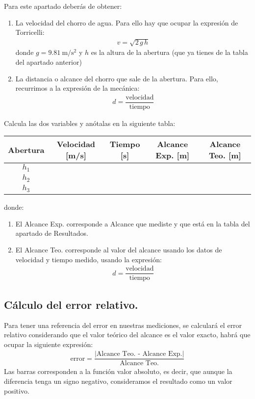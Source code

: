 \documentclass[14pt]{extarticle}
\begin{document}
Para este apartado deberás de obtener:
\begin{enumerate}[label=\roman*)]
\item La velocidad del chorro de agua. Para ello hay que ocupar la expresión de Torricelli:
\begin{align*}
v = \sqrt{2 \, g \, h}
\end{align*}
donde $ g = \SI{9.81}{\meter\per\square\second}$ y $h$ es la altura de la abertura (que ya tienes de la tabla del apartado anterior)
\item La distancia o alcance del chorro que sale de la abertura. Para ello, recurrimos a la expresión de la mecánica:
\begin{align*}
d = \dfrac{\text{velocidad}}{\text{tiempo}}
\end{align*}
\end{enumerate}
Calcula las dos variables y anótalas en la siguiente tabla:
\begin{table}[H]
\centering
\begin{tabular}{| c | c | c | c | c |} \hline
Abertura & Velocidad [m/s] & Tiempo [s] & Alcance Exp. [m] & Alcance Teo. [m] \\ \hline
$h_{1}$ & & & & \\ \hline
$h_{2}$ & & & & \\ \hline
$h_{3}$ & & & & \\ \hline
\end{tabular}
\end{table}
donde:
\begin{enumerate}
\item El Alcance Exp. corresponde a Alcance que mediste y que está en la tabla del apartado de Resultados.
\item El Alcance Teo. corresponde al valor del alcance usando los datos de velocidad y tiempo medido, usando la expresión:
\begin{align*}
d = \dfrac{\text{velocidad}}{\text{tiempo}}
\end{align*}
\end{enumerate}

\subsection{Cálculo del error relativo.}

Para tener una referencia del error en nuestras mediciones, se calculará el error relativo considerando que el valor teórico del alcance es el valor exacto, habrá que ocupar la siguiente expresión:
\begin{align*}
\text{error} = \dfrac{\vert \text{Alcance Teo. - Alcance Exp.} \vert}{\text{Alcance Teo.}}
\end{align*}
Las barras corresponden a la función valor absoluto, es decir, que aunque la diferencia tenga un signo negativo, consideramos el resultado como un valor positivo.
\end{document}
